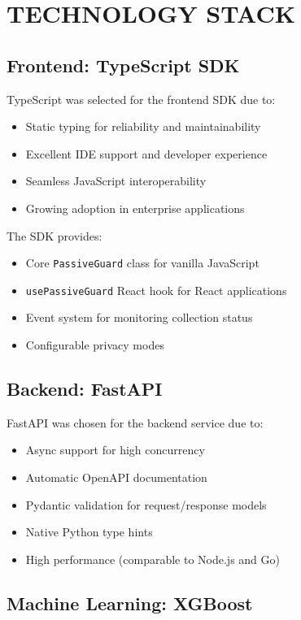 \section{TECHNOLOGY STACK}

\subsection{Frontend: TypeScript SDK}

TypeScript was selected for the frontend SDK due to:
\begin{itemize}
    \item Static typing for reliability and maintainability
    \item Excellent IDE support and developer experience
    \item Seamless JavaScript interoperability
    \item Growing adoption in enterprise applications
\end{itemize}

The SDK provides:
\begin{itemize}
    \item Core \texttt{PassiveGuard} class for vanilla JavaScript
    \item \texttt{usePassiveGuard} React hook for React applications
    \item Event system for monitoring collection status
    \item Configurable privacy modes
\end{itemize}

\subsection{Backend: FastAPI}

FastAPI was chosen for the backend service due to:
\begin{itemize}
    \item Async support for high concurrency
    \item Automatic OpenAPI documentation
    \item Pydantic validation for request/response models
    \item Native Python type hints
    \item High performance (comparable to Node.js and Go)
\end{itemize}

\subsection{Machine Learning: XGBoost}

